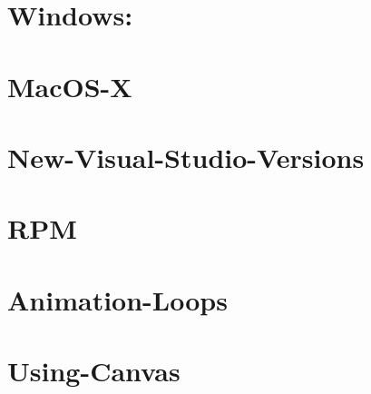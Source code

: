 \let\mypdfximage\pdfximage\def\pdfximage{\immediate\mypdfximage}\documentclass[twoside]{book}
\newcommand{\+}{\discretionary{\mbox{\scriptsize$\hookleftarrow$}}{}{}}
\begin{document}
\chapter{Windows\+:}
\label{md__home_rvree__t_s_g_l_2_81__t_s_g_l__t_s_g_l_8wiki__library-_versions}

\chapter{Mac\+O\+S-\/X}
\label{md__home_rvree__t_s_g_l_2_81__t_s_g_l__t_s_g_l_8wiki__mac_o_s-_x}

\chapter{New-\/\+Visual-\/\+Studio-\/\+Versions}
\label{md__home_rvree__t_s_g_l_2_81__t_s_g_l__t_s_g_l_8wiki__new-_visual-_studio-_versions}

\chapter{R\+PM}
\label{md__home_rvree__t_s_g_l_2_81__t_s_g_l__t_s_g_l_8wiki__r_p_m}

\chapter{Animation-\/\+Loops}
\label{md__home_rvree__t_s_g_l_2_81__t_s_g_l__t_s_g_l_8wiki_tutorials__animation-_loops}

\chapter{Using-\/\+Canvas}
\label{md__home_rvree__t_s_g_l_2_81__t_s_g_l__t_s_g_l_8wiki_tutorials__using-_canvas}

\end{document}

